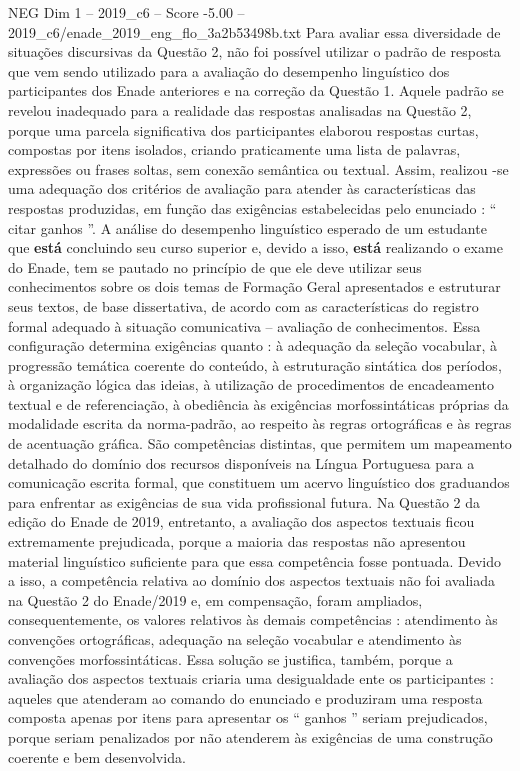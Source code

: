 \begin{textsample}{NEG Dim 1 – 2019\_c6 – Score -5.00 – 2019\_c6/enade\_2019\_eng\_flo\_3a2b53498b.txt}
Para avaliar essa diversidade de situações discursivas da Questão 2, não foi possível utilizar o padrão de resposta que vem sendo utilizado para a avaliação do desempenho linguístico dos participantes dos Enade anteriores e na correção da Questão 1.
Aquele padrão se revelou inadequado para a realidade das respostas analisadas na Questão 2, porque uma parcela significativa dos participantes elaborou respostas curtas, compostas por itens isolados, criando praticamente uma lista de palavras, expressões ou frases soltas, sem conexão semântica ou textual.
Assim, realizou -se uma adequação dos critérios de avaliação para atender às características das respostas produzidas, em função das exigências estabelecidas pelo enunciado : “ citar ganhos ”.
A análise do desempenho linguístico esperado de um estudante que \textbf{está} concluindo seu curso superior e, devido a isso, \textbf{está} realizando o exame do Enade, tem se pautado no princípio de que ele deve utilizar seus conhecimentos sobre os dois temas de Formação Geral apresentados e estruturar seus textos, de base dissertativa, de acordo com as características do registro formal adequado à situação comunicativa – avaliação de conhecimentos.
Essa configuração determina exigências quanto : à adequação da seleção vocabular, à progressão temática coerente do conteúdo, à estruturação sintática dos períodos, à organização lógica das ideias, à utilização de procedimentos de encadeamento textual e de referenciação, à obediência às exigências morfossintáticas próprias da modalidade escrita da norma-padrão, ao respeito às regras ortográficas e às regras de acentuação gráfica.
São competências distintas, que permitem um mapeamento detalhado do domínio dos recursos disponíveis na Língua Portuguesa para a comunicação escrita formal, que constituem um acervo linguístico dos graduandos para enfrentar as exigências de sua vida profissional futura.
Na Questão 2 da edição do Enade de 2019, entretanto, a avaliação dos aspectos textuais ficou extremamente prejudicada, porque a maioria das respostas não apresentou material linguístico suficiente para que essa competência fosse pontuada.
Devido a isso, a competência relativa ao domínio dos aspectos textuais não foi avaliada na Questão 2 do Enade/2019 e, em compensação, foram ampliados, consequentemente, os valores relativos às demais competências : atendimento às convenções ortográficas, adequação na seleção vocabular e atendimento às convenções morfossintáticas.
Essa solução se justifica, também, porque a avaliação dos aspectos textuais criaria uma desigualdade ente os participantes : aqueles que atenderam ao comando do enunciado e produziram uma resposta composta apenas por itens para apresentar os “ ganhos ” seriam prejudicados, porque seriam penalizados por não atenderem às exigências de uma construção coerente e bem desenvolvida.

\end{textsample}
